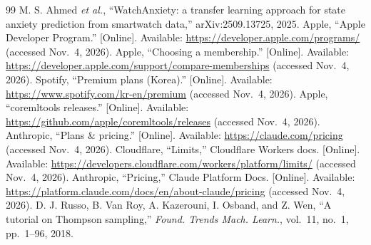 \documentclass[conference]{IEEEtran}
\begin{document}
\begin{thebibliography}{99}
 M. S. Ahmed \textit{et al.}, ``WatchAnxiety: a transfer learning approach for state anxiety prediction from smartwatch data,'' arXiv:2509.13725, 2025.
 Apple, ``Apple Developer Program.'' [Online]. Available: \url{https://developer.apple.com/programs/} (accessed Nov.\ 4, 2026).
 Apple, ``Choosing a membership.'' [Online]. Available: \url{https://developer.apple.com/support/compare-memberships} (accessed Nov.\ 4, 2026).
 Spotify, ``Premium plans (Korea).'' [Online]. Available: \url{https://www.spotify.com/kr-en/premium} (accessed Nov.\ 4, 2026).
 Apple, ``coremltools releases.'' [Online]. Available: \url{https://github.com/apple/coremltools/releases} (accessed Nov.\ 4, 2026).
 Anthropic, ``Plans \& pricing.'' [Online]. Available: \url{https://claude.com/pricing} (accessed Nov.\ 4, 2026).
 Cloudflare, ``Limits,'' Cloudflare Workers docs. [Online]. Available: \url{https://developers.cloudflare.com/workers/platform/limits/} (accessed Nov.\ 4, 2026).
 Anthropic, ``Pricing,'' Claude Platform Docs. [Online]. Available: \url{https://platform.claude.com/docs/en/about-claude/pricing} (accessed Nov.\ 4, 2026).
 D. J. Russo, B. Van Roy, A. Kazerouni, I. Osband, and Z. Wen, ``A tutorial on Thompson sampling,'' \textit{Found. Trends Mach. Learn.}, vol.~11, no.~1, pp.~1--96, 2018.
\end{thebibliography}
\end{document}
